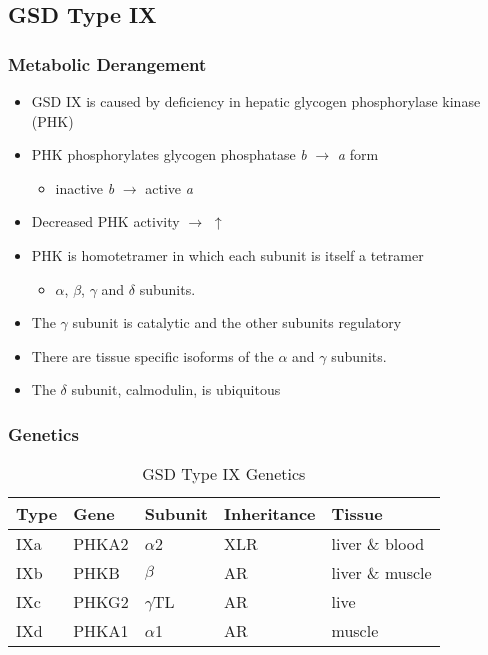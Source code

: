 \documentclass{scrartcl}
\begin{document}
\subsection{GSD Type IX}
\label{sec:org36f4c90}
\subsubsection{Metabolic Derangement}
\label{sec:org3b9e889}
\begin{itemize}
\item GSD IX is caused by deficiency in hepatic glycogen phosphorylase kinase (PHK)
\item PHK phosphorylates glycogen phosphatase \emph{b} \(\to\) \emph{a} form
\begin{itemize}
\item inactive \emph{b} \(\to\)  active \emph{a}
\end{itemize}
\item Decreased PHK activity \(\to\) \(\uparrow\)
\item PHK is homotetramer in which each subunit is itself a tetramer
\begin{itemize}
\item \(\alpha\), \(\beta\), \(\gamma\) and \(\delta\) subunits.
\end{itemize}
\item The \(\gamma\) subunit is catalytic and the other subunits regulatory
\item There are tissue specific isoforms of the \(\alpha\) and \(\gamma\) subunits.
\item The \(\delta\) subunit, calmodulin, is ubiquitous
\end{itemize}

\subsubsection{Genetics}
\label{sec:org9356c61}
\begin{table}[htbp]
\caption{\label{tab:orga6f4a6d}
GSD Type IX Genetics}
\centering
\begin{tabular}{lllll}
Type & Gene & Subunit & Inheritance & Tissue\\
\hline
IXa & PHKA2 & \(\alpha\)2 & XLR & liver \& blood\\
IXb & PHKB & \(\beta\) & AR & liver \& muscle\\
IXc & PHKG2 & \(\gamma\)TL & AR & live\\
IXd & PHKA1 & \(\alpha\)1 & AR & muscle\\
\end{tabular}
\end{table}
\end{document}
